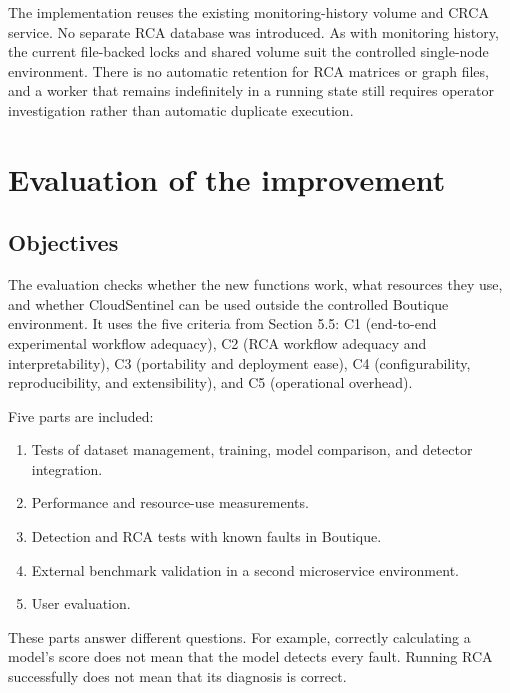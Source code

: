The implementation reuses the existing monitoring-history volume and CRCA service. No separate RCA database was introduced. As with monitoring history, the current file-backed locks and shared volume suit the controlled single-node environment. There is no automatic retention for RCA matrices or graph files, and a worker that remains indefinitely in a running state still requires operator investigation rather than automatic duplicate execution.


\section{Evaluation of the improvement}
\label{sec:improvement-evaluation}

\subsection{Objectives}

The evaluation checks whether the new functions work, what resources they use, and whether CloudSentinel can be used outside the controlled Boutique environment. It uses the five criteria from Section 5.5: C1 (end-to-end experimental workflow adequacy), C2 (RCA workflow adequacy and interpretability), C3 (portability and deployment ease), C4 (configurability, reproducibility, and extensibility), and C5 (operational overhead).

Five parts are included:
\begin{enumerate}
    \item Tests of dataset management, training, model comparison, and detector integration.
    \item Performance and resource-use measurements.
    \item Detection and RCA tests with known faults in Boutique.
    \item External benchmark validation in a second microservice environment.
    \item User evaluation.
\end{enumerate}

These parts answer different questions. For example, correctly calculating a model's score does not mean that the model detects every fault. Running RCA successfully does not mean that its diagnosis is correct.

